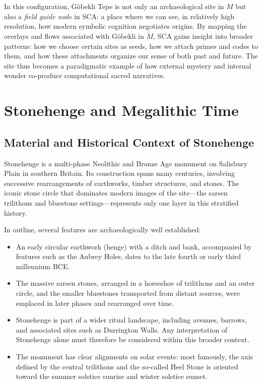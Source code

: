 \documentclass[12]{amsart}
\theoremstyle{plain}
\begin{document}
In this configuration, Göbekli Tepe is not only an archaeological site in $M$ but also a \emph{field guide node} in SCA: a place where we can see, in relatively high resolution, how modern symbolic cognition negotiates origins. By mapping the overlays and flows associated with Göbekli in $\tilde M$, SCA gains insight into broader patterns: how we choose certain sites as seeds, how we attach primes and codes to them, and how these attachments organize our sense of both past and future. The site thus becomes a paradigmatic example of how external mystery and internal wonder co-produce computational sacred narratives.

\section{Stonehenge and Megalithic Time}

\subsection{Material and Historical Context of Stonehenge}

Stonehenge is a multi-phase Neolithic and Bronze Age monument on Salisbury Plain in southern Britain. Its construction spans many centuries, involving successive rearrangements of earthworks, timber structures, and stones. The iconic stone circle that dominates modern images of the site---the sarsen trilithons and bluestone settings---represents only one layer in this stratified history.

In outline, several features are archaeologically well established:

\begin{itemize}
  \item An early circular earthwork (henge) with a ditch and bank, accompanied by features such as the Aubrey Holes, dates to the late fourth or early third millennium BCE.
  \item The massive sarsen stones, arranged in a horseshoe of trilithons and an outer circle, and the smaller bluestones transported from distant sources, were emplaced in later phases and rearranged over time.
  \item Stonehenge is part of a wider ritual landscape, including avenues, barrows, and associated sites such as Durrington Walls. Any interpretation of Stonehenge alone must therefore be considered within this broader context.
  \item The monument has clear alignments on solar events: most famously, the axis defined by the central trilithons and the so-called Heel Stone is oriented toward the summer solstice sunrise and winter solstice sunset.
\end{itemize}
\end{document}
